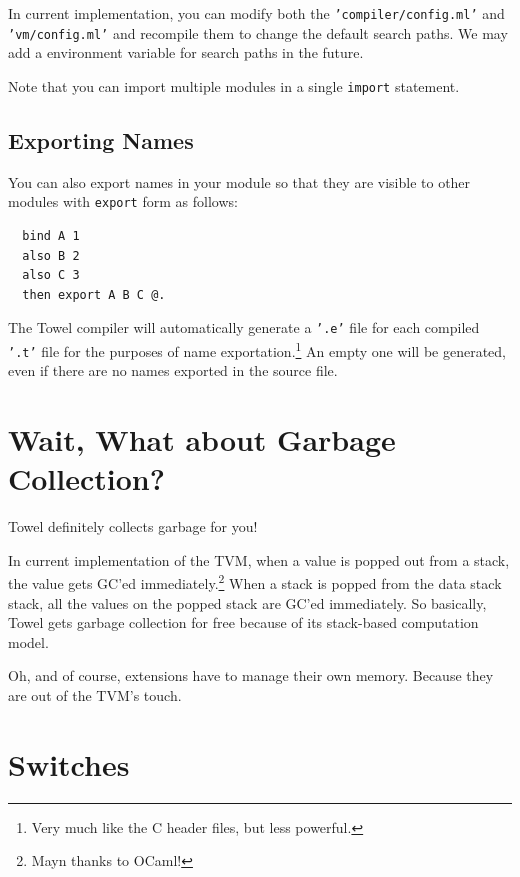 \documentclass{report}
\begin{document}
\begin{mdframed}[style=detail]
  In current implementation, you can modify both the \texttt{'compiler/config.ml'} and \texttt{'vm/config.ml'} and recompile them to change the default search paths. We may add a environment variable for search paths in the future.
\end{mdframed}

Note that you can import multiple modules in a single \texttt{import} statement.

\subsection{Exporting Names}

You can also export names in your module so that they are visible to other modules with \texttt{export} form as follows:

\begin{mdframed}[style=example]
\begin{verbatim}
  bind A 1
  also B 2
  also C 3
  then export A B C @.
\end{verbatim}
\end{mdframed}

The Towel compiler will automatically generate a \texttt{'.e'} file for each compiled \texttt{'.t'} file for the purposes of name exportation.\footnote{Very much like the C header files, but less powerful.} An empty one will be generated, even if there are no names exported in the source file.

\section{Wait, What about Garbage Collection?}

Towel definitely collects garbage for you!

In current implementation of the TVM, when a value is popped out from a stack, the value gets GC'ed immediately.\footnote{Mayn thanks to OCaml!} When a stack is popped from the data stack stack, all the values on the popped stack are GC'ed immediately. So basically, Towel gets garbage collection for free because of its stack-based computation model.

Oh, and of course, extensions have to manage their own memory. Because they are out of the TVM's touch.

\section{Switches}
\label{sec:switches}
\end{document}
